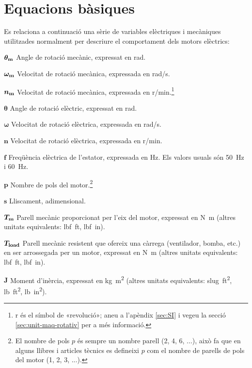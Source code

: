 \section{Equacions bàsiques}

Es relaciona a continuació una sèrie de variables elèctriques i mecàniques utilitzades normalment per descriure el comportament dels motors elèctrics:

\begin{list}{}
   {\setlength{\labelwidth}{12mm} \setlength{\leftmargin}{12mm} \setlength{\labelsep}{2mm}}
   \item[$\boldsymbol{\theta_\mathrm{m}}$] Angle de rotació mecànic, expressat en \unit{rad}.
   \item[$\boldsymbol{\omega_\mathrm{m}}$] Velocitat de rotació mecànica, expressada en \unit{rad/s}.
   \item[$\boldsymbol{n_\mathrm{m}}$] Velocitat de rotació mecànica, expressada en \unit{r/min}.\footnote{r és el símbol de «revolució»; aneu a l'apèndix \ref{sec:SI} i vegeu la secció \ref{sec:unit-maq-rotativ} per a més informació.}
   \item[$\boldsymbol{\theta}$] Angle de rotació elèctric, expressat en \unit{rad}.
   \item[$\boldsymbol{\omega}$] Velocitat de rotació elèctrica, expressada en \unit{rad/s}.
   \item[$\boldsymbol{n}$] Velocitat de rotació elèctrica, expressada en \unit{r/min}.
   \item[$\boldsymbol{f}$] Freqüència elèctrica de l'estator, expressada en \unit{Hz}. Els valors usuals són \qty{50}{Hz} i \qty{60}{Hz}.
   \item[$\boldsymbol{p}$] Nombre de pols del motor.\footnote{El nombre de pols $p$  és sempre un nombre parell (2, 4, 6, ...), això fa que en alguns llibres i articles tècnics es defineixi $p$ com el nombre de parells de pols del motor       (1, 2, 3, ...).}
   \item[$\boldsymbol{s}$] Lliscament, adimensional.
   \item[$\boldsymbol{T_\mathrm{m}}$] Parell mecànic proporcionat per l'eix del motor, expressat en \unit{N.m} (altres unitats equivalents: \unit{lbf.ft}, \unit{lbf.in}).
   \item[$\boldsymbol{T_\mathrm{load}}$] Parell mecànic resistent que ofereix una càrrega (ventilador, bomba, etc.) en ser arrossegada per un motor, expressat en \unit{N.m} (altres unitats equivalents: \unit{lbf.ft}, \unit{lbf.in}).
   \item[$\boldsymbol{J}$] Moment d'inèrcia, expressat en \unit{kg.m^2} (altres unitats equivalents: \unit{slug.ft^2}, \unit{lb.ft^2}, \unit{lb.in^2}).

\end{list}
